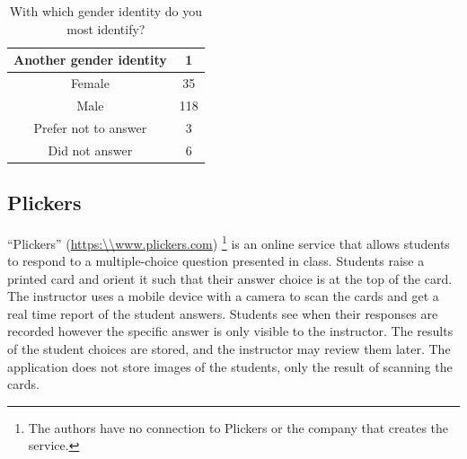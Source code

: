 \documentclass[12pt]{article}
\begin{document}
\begin{table}[ht]
\centering
\caption{With which gender identity do you most identify?}
\begin{tabular}{|c|c|}
\toprule
Another gender identity & 1 \\\midrule
\rowcolor{LightGray}
Female & 35 \\\midrule
Male & 118 \\\midrule
\rowcolor{LightGray}
Prefer not to answer & 3\\\midrule
Did not answer & 6\\ \bottomrule
\end{tabular}
\end{table}

\subsection{Plickers}
``Plickers'' (\url{https:\\www.plickers.com}) \footnote{The authors have no connection to Plickers or the company that creates the service.} is an online service that allows students to respond to a multiple-choice question presented in class. Students raise a printed card and orient it such that their answer choice is at the top of the card. The instructor uses a mobile device with a camera to scan the cards and get a real time report of the student answers. Students see when their responses are recorded however the specific answer is only visible to the instructor. The results of the student choices are stored, and the instructor may review them later. The application does not store images of the students, only the result of scanning the cards. 
\end{document}

